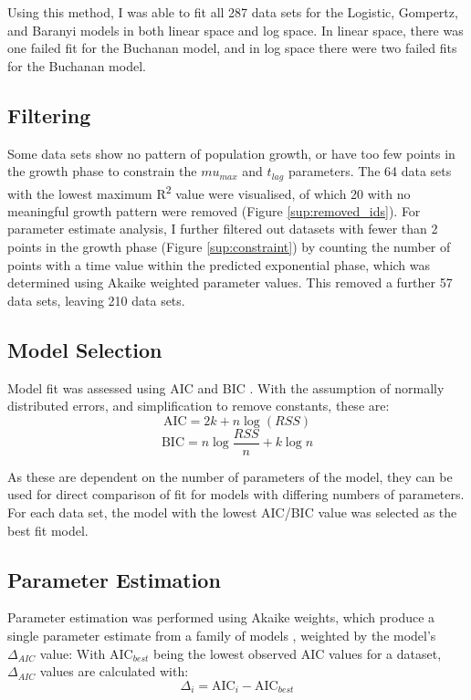 \documentclass[11pt, a4paper]{article}
\begin{document}
\begin{linenumbers}
Using this method, I was able to fit all 287 data sets for the Logistic, Gompertz, and Baranyi models in both linear space and log space. In linear space, there was one failed fit for the Buchanan model, and in log space there were two failed fits for the Buchanan model.


\subsection{Filtering}
Some data sets show no pattern of population growth, or have too few points in the growth phase to constrain the $mu_{max}$ and $t_{lag}$ parameters. The 64 data sets with the lowest maximum R\textsuperscript{2} value were visualised, of which 20 with no meaningful growth pattern were removed (Figure \ref{sup:removed_ids}). For parameter estimate analysis, I further filtered out datasets with fewer than 2 points in the growth phase (Figure \ref{sup:constraint}) by counting the number of points with a time value within the predicted exponential phase, which was determined using Akaike weighted parameter values. This removed a further 57 data sets, leaving 210 data sets.


\subsection{Model Selection}

Model fit was assessed using AIC \cite{AIC} and BIC \cite{BIC}. With the assumption of normally distributed errors, and simplification to remove constants, these are:
\[\text {AIC}  = 2k + n\log(RSS)\]
\[\text {BIC} = n\log{\frac{RSS}{n}} + k\log{n}\]

As these are dependent on the number of parameters of the model, they can be used for direct comparison of fit for models with differing numbers of parameters. For each data set, the model with the lowest AIC/BIC value was selected as the best fit model.


\subsection{Parameter Estimation}

Parameter estimation was performed using Akaike weights, which produce a single parameter estimate from a family of models \cite{ModelSelection}, weighted by the model’s $\Delta_{AIC}$ value:
With $\text{AIC}_{best}$ being the lowest observed AIC values for a dataset, $\Delta_{AIC}$ values are calculated with:
\[ \Delta_i = \text{AIC}_i - \text{AIC}_{best} \]


\end{linenumbers}
\end{document}
